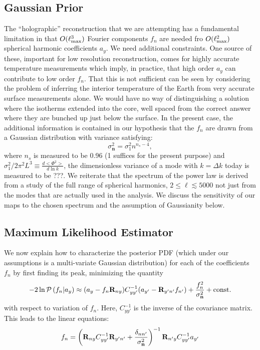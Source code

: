 \documentclass[useAMS,usenatbib,a4paper]{mn2e}
\begin{document}
\subsection{Gaussian Prior}
The ``holographic'' reconstruction that we are attempting has a fundamental limitation in that $O(\ell_{\rm max}^3)$ Fourier components $f_n$ are needed fro $O(\ell_{\rm max}^2)$ spherical harmonic coefficients $a_y$. We need additional constraints. One source of these, important for low resolution reconstruction, comes for highly accurate temperature measurements which imply, in practice, that high order $a_y$ can contribute to low order $f_n$. That this is not sufficient can be seen by considering the problem of inferring the interior temperature of the Earth from very accurate surface measurements alone. We would have no way of distinguishing a solution where the isotherms extended into the core, well spaced from the correct answer where they are bunched up just below the surface. In the present case, the additional information is contained in our hypothesis that the $f_n$ are drawn from a Gaussian distribution with variance satisfying:
\begin{equation}
\sigma_\mathbf{n}^2=\sigma_1^2n^{n_s-4},
\end{equation}
where $n_s$ is measured to be 0.96 (1 suffices for the present purpose) and $\sigma_1^2/2\pi^2L^3\equiv\frac{d<\Phi^2>}{d\ln k}$, the dimensionless variance of a mode with $k=\Delta k$ today is measured to be ???. We reiterate that the spectrum of the power law is derived from a study of the full range of spherical harmonics, $2\le\ell\lesssim5000$ not just from the modes that are actually used in the analysis. We discuss the sensitivity of our maps to the chosen spectrum and the assumption of Gaussianity below.
\subsection{Maximum Likelihood Estimator}
We now explain how to characterize the posterior PDF (which under our assumptions is a multi-variate Gaussian distribution) for each of the coefficients $f_n$ by first finding its peak, minimizing the quantity
\begin{equation}
-2\ln{\cal P}\left(f_n|a_y\right) \approx (a_y- f_n\mathbf{R}_{ny})C_{yy'}^{-1}(a_{y'}-\mathbf{R}_{y'n'}f_{n'})+\frac{f_n^2}{\sigma_{{\bf n}}^2} + \mathrm{const.}
\end{equation}
with respect to variation of $f_n$. Here, $C_{yy'}^{-1}$ is the inverse of the covariance matrix. This leads to the linear equations:
\begin{equation}
f_n=\left(\mathbf{R}_{ny}C_{yy'}^{-1}\mathbf{R}_{y'n'}+\frac{\delta_{nn'}}{\sigma_{\bf n}^2}\right)^{-1}\mathbf{R}_{n'y}C_{yy'}^{-1}a_{y'}
\label{eq:bayes}
\end{equation}
\end{document}
